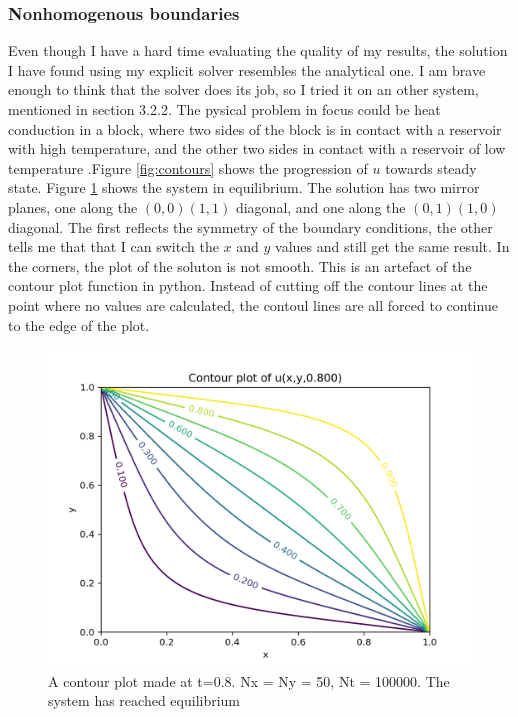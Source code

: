 \documentclass{article}
\begin{document}
\subsubsection{Nonhomogenous boundaries}
Even though I have a hard time evaluating the quality of my results, the solution I have found using my explicit solver resembles the analytical one. I am brave enough to think that the solver does its job, so I tried it on an other system, mentioned in section 3.2.2. The pysical problem in focus could be heat conduction in a block, where two sides of the block is in contact with a reservoir with high temperature, and the other two sides in contact with a reservoir of low temperature .Figure \ref{fig:contours} shows the progression of $u$ towards steady state. Figure \ref{fig:contour40} shows the system in equilibrium. The solution has two mirror planes, one along the $(0,0)(1,1)$ diagonal, and one along the $(0,1)(1,0)$ diagonal. The first reflects the symmetry of the boundary conditions, the other tells me that that I can switch the $x$ and $y$ values and still get the same result. In the corners, the plot of the soluton is not smooth. This is an artefact of the contour plot function in python. Instead of cutting off the contour lines at the point where no values are calculated, the contoul lines are all forced to continue to the edge of the plot. 
 \begin{figure}
  \includegraphics[width=\linewidth]{contour40.png}
  \caption{A contour plot made at t=0.8. Nx = Ny = 50, Nt = 100000. The system has reached equilibrium}
  \label{fig:contour40}
\end{figure} 
\end{document}
